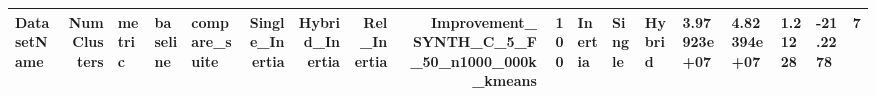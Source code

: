 \begin{tabular}{lrlllrrrrr}
\toprule
DatasetName & NumClusters & metric & baseline & compare_suite & Single_Inertia & Hybrid_Inertia & Rel_Inertia & Improvement_%
\midrule
SYNTH_C_5_F_50_n1000_000k_kmeans & 100 & Inertia & Single & Hybrid & 3.97923e+07 & 4.82394e+07 & 1.21228 & -21.2278 & 7 \\
\bottomrule
\end{tabular}
